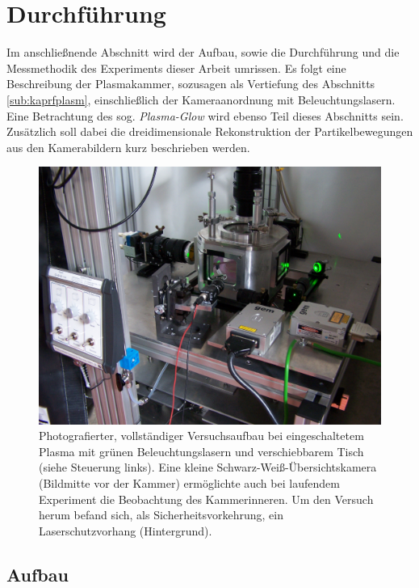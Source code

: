 \documentclass[numbers=noenddot,a4paper]{scrartcl}
\newcommand{\tilt}[1]{\textit{#1}}
\begin{document}
	\newpage

	\section{Durchführung}\label{sec:durch}

		Im anschlie{\ss}nende Abschnitt wird der Aufbau, sowie die Durchf\"uhrung und die Messmethodik des Experiments dieser Arbeit umrissen. Es folgt eine Beschreibung der Plasmakammer, sozusagen als Vertiefung des Abschnitts \ref{sub:kaprfplasm}, einschlie{\ss}lich der Kameraanordnung mit Beleuchtungslasern. Eine Betrachtung des sog. \tilt{Plasma-Glow} wird ebenso Teil dieses Abschnitts sein. Zus\"atzlich soll dabei die dreidimensionale Rekonstruktion der Partikelbewegungen aus den Kamerabildern kurz beschrieben werden.

			\begin{figure}[H]
				\centering
				\includegraphics[width=\textwidth,height=0.7\textwidth]{figs/cam/aufbau.jpg}
				\caption{Photografierter, vollständiger Versuchsaufbau bei eingeschaltetem Plasma mit grünen Beleuchtungslasern und verschiebbarem Tisch (siehe Steuerung links). Eine kleine Schwarz-Weiß-Übersichtskamera (Bildmitte vor der Kammer) ermöglichte auch bei laufendem Experiment die Beobachtung des Kammerinneren. Um den Versuch herum befand sich, als Sicherheitsvorkehrung, ein Laserschutzvorhang (Hintergrund).}
				\label{img:photo}
			\end{figure}

		\subsection{Aufbau}
\end{document}
